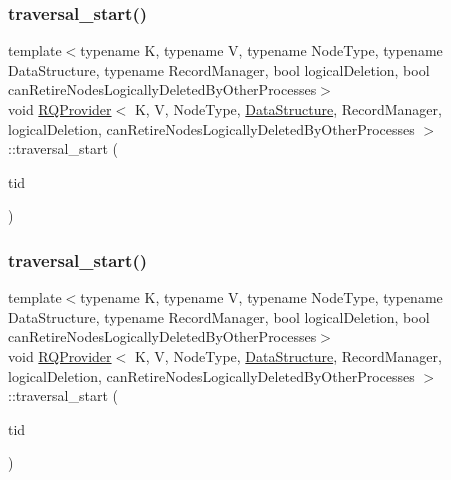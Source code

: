 \mbox{\label{classRQProvider_a96fe481c7ba6b30efbd90ac1eca1e788}} 
\subsubsection{\texorpdfstring{traversal\+\_\+start()}{traversal\_start()}\hspace{0.1cm}{\footnotesize\ttfamily [2/5]}}
{\footnotesize\ttfamily template$<$typename K, typename V, typename Node\+Type, typename Data\+Structure, typename Record\+Manager, bool logical\+Deletion, bool can\+Retire\+Nodes\+Logically\+Deleted\+By\+Other\+Processes$>$ \\
void \hyperlink{classRQProvider}{R\+Q\+Provider}$<$ K, V, Node\+Type, \hyperlink{classDataStructure}{Data\+Structure}, Record\+Manager, logical\+Deletion, can\+Retire\+Nodes\+Logically\+Deleted\+By\+Other\+Processes $>$\+::traversal\+\_\+start (\begin{DoxyParamCaption}\item[{const int}]{tid }\end{DoxyParamCaption})\hspace{0.3cm}{\ttfamily [inline]}}

\mbox{\label{classRQProvider_a96fe481c7ba6b30efbd90ac1eca1e788}} 
\subsubsection{\texorpdfstring{traversal\+\_\+start()}{traversal\_start()}\hspace{0.1cm}{\footnotesize\ttfamily [3/5]}}
{\footnotesize\ttfamily template$<$typename K, typename V, typename Node\+Type, typename Data\+Structure, typename Record\+Manager, bool logical\+Deletion, bool can\+Retire\+Nodes\+Logically\+Deleted\+By\+Other\+Processes$>$ \\
void \hyperlink{classRQProvider}{R\+Q\+Provider}$<$ K, V, Node\+Type, \hyperlink{classDataStructure}{Data\+Structure}, Record\+Manager, logical\+Deletion, can\+Retire\+Nodes\+Logically\+Deleted\+By\+Other\+Processes $>$\+::traversal\+\_\+start (\begin{DoxyParamCaption}\item[{const int}]{tid }\end{DoxyParamCaption})\hspace{0.3cm}{\ttfamily [inline]}}

